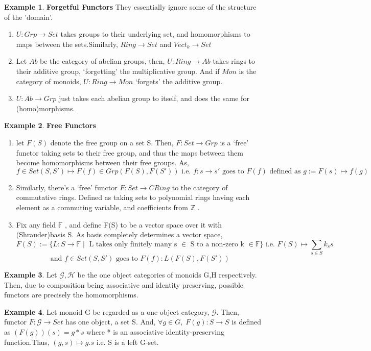 \documentclass{article}
\theoremstyle{definition}
\newtheorem{example}{Example}[section]
\theoremstyle{definition}
\theoremstyle{definition}
\theoremstyle{definition}
\begin{document}
\begin{example}{\textbf{Forgetful Functors}} %
	They essentially ignore some of the structure of the 'domain'.
	\begin{enumerate}[label=(\alph*)]
		\item $ U:Grp\rightarrow Set $ takes groups to their underlying set, and homomorphisms to maps between the sets.Similarly, $ Ring \rightarrow Set $ and $ Vect_k \rightarrow Set $
		\item Let $ Ab $ be the category of abelian groups, then,   $ U:Ring \rightarrow Ab $ takes rings to their additive group, `forgetting' the multiplicative group. And if $ Mon $ is the category of monoids, $ U:Ring \rightarrow Mon $ `forgets' the additive group.
		\item $ U:Ab \rightarrow Grp $ just takes each abelian group to itself, and does the same for (homo)morphisms.
	\end{enumerate}
\end{example}
\begin{example}{\textbf{Free Functors}} %
	\begin{enumerate}[label=(\alph*)]
		\item let $ F(S) $ denote the free group on a set S. Then, $ F:Set \rightarrow Grp $ is a `free' functor taking sets to their free group, and thus the maps between them become homomorphisms between their free groups. As,
			\[ f \in Set(S,S') \mapsto F(f) \in Grp(F(S),F(S')) \text{ i.e. } f:s \rightarrow s' \text{ goes to } F(f) \text{ defined as } g:=F(s) \mapsto f(g)    \]
		\item Similarly, there's a `free' functor $ F:Set \rightarrow CRing $ to the category of commutative rings. Defined as taking sets to polynomial rings having each element as a commuting variable, and coefficients from $ \mathbb{Z}$  .
		\item Fix any field $ \mathbb{F} $ , and define F(S) to be a vector space over it with (Shrauder)basis S. As basis completely determines a vector space,
			\[ F(S):= \{ L: S \rightarrow \mathbb{F} \; |\; \text{ L takes only finitely many s } \in \text{ S to a non-zero k } \in \mathbb{F} \} \text{ i.e. } F(S) \mapsto \sum_{s \in S} k_ss  \]
			\[ \text{ and } f \in Set(S,S') \text{ goes to } F(f): L(F(S),F(S'))\]
	\end{enumerate}
\end{example}
\begin{example}
	Let $ \mathcal{G}, \mathcal{H}$ be the one object categories of monoids G,H respectively. Then, due to composition being associative and identity preserving, possible functors are precisely the homomorphisms.
\end{example}
\begin{example}
	Let monoid G be regarded as a one-object category, $ \mathcal{G} $. Then, functor $ F:\mathcal{G} \rightarrow Set $ has one object, a set S. And, $ \forall g \in G, \; F(g):S \rightarrow S  $ is defined as $ (F(g))(s)=g*s$ where * is an associative identity-preserving function.Thus, $ (g,s) \mapsto g.s $ i.e. S is a left G-set.
\end{example}
\end{document}
